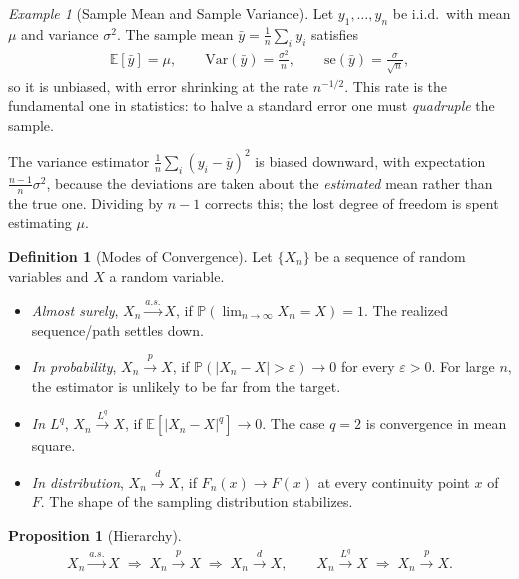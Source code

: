 \documentclass[11pt]{article}
\theoremstyle{definition}
\newtheorem{definition}{Definition}[section]
\theoremstyle{plain}
\newtheorem{proposition}{Proposition}[section]
\theoremstyle{remark}
\newtheorem{example}{Example}[section]
\begin{document}
\begin{example}[Sample Mean and Sample Variance]
    Let $y_1,\dots,y_n$ be i.i.d.\ with mean $\mu$ and variance $\sigma^2$. The sample mean $\bar{y} = \frac{1}{n}\sum_i y_i$ satisfies
    \begin{align}
        \mathbb{E}[\bar{y}] = \mu, \qquad \mathrm{Var}(\bar{y}) = \frac{\sigma^2}{n}, \qquad \mathrm{se}(\bar{y}) = \frac{\sigma}{\sqrt{n}},
    \end{align}
    so it is unbiased, with error shrinking at the rate $n^{-1/2}$. This rate is the fundamental one in statistics: to halve a standard error one must \emph{quadruple} the sample.

    The variance estimator $\frac{1}{n}\sum_i (y_i - \bar{y})^2$ is biased downward, with expectation $\frac{n-1}{n}\sigma^2$, because the deviations are taken about the \emph{estimated} mean rather than the true one. Dividing by $n-1$ corrects this; the lost degree of freedom is spent estimating $\mu$.
\end{example}

\begin{definition}[Modes of Convergence]
    Let $\{X_n\}$ be a sequence of random variables and $X$ a random variable.
    \begin{itemize}[noitemsep]
        \item \emph{Almost surely}, $X_n \xrightarrow{a.s.} X$, if $\mathbb{P}\!\left(\lim_{n\to\infty} X_n = X\right) = 1$. The realized sequence/path settles down.
        \item \emph{In probability}, $X_n \xrightarrow{p} X$, if $\mathbb{P}(|X_n - X| > \varepsilon) \to 0$ for every $\varepsilon > 0$. For large $n$, the estimator is unlikely to be far from the target. 
        \item \emph{In $L^q$}, $X_n \xrightarrow{L^q} X$, if $\mathbb{E}[|X_n - X|^q] \to 0$. The case $q=2$ is convergence in mean square.
        \item \emph{In distribution}, $X_n \xrightarrow{d} X$, if $F_n(x) \to F(x)$ at every continuity point $x$ of $F$. The shape of the sampling distribution stabilizes.
    \end{itemize}
\end{definition}

\begin{proposition}[Hierarchy]
    \begin{align}
        X_n \xrightarrow{a.s.} X \;\Longrightarrow\; X_n \xrightarrow{p} X \;\Longrightarrow\; X_n \xrightarrow{d} X,
        \qquad
        X_n \xrightarrow{L^q} X \;\Longrightarrow\; X_n \xrightarrow{p} X .
    \end{align}
\end{proposition}
\end{document}
